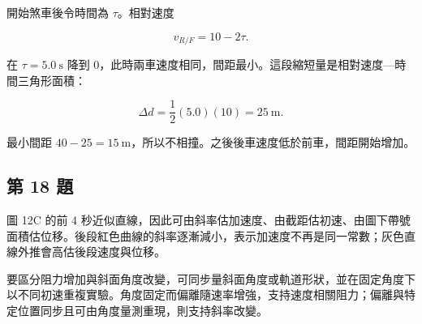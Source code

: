 \documentclass[11pt,a4paper]{article}
\begin{document}
開始煞車後令時間為 \(\tau\)。相對速度

\[
v_{R/F}=10-2\tau.
\]

在 \(\tau=5.0\ \mathrm s\) 降到 0，此時兩車速度相同，間距最小。這段縮短量是相對速度---時間三角形面積：

\[
\Delta d=\frac12(5.0)(10)=25\ \mathrm m.
\]

最小間距 \(40-25=15\ \mathrm m\)，所以不相撞。之後後車速度低於前車，間距開始增加。

\subsection{第 18 題}\label{ux7b2c-18-ux984c}

圖 12C 的前 4 秒近似直線，因此可由斜率估加速度、由截距估初速、由圖下帶號面積估位移。後段紅色曲線的斜率逐漸減小，表示加速度不再是同一常數；灰色直線外推會高估後段速度與位移。

要區分阻力增加與斜面角度改變，可同步量斜面角度或軌道形狀，並在固定角度下以不同初速重複實驗。角度固定而偏離隨速率增強，支持速度相關阻力；偏離與特定位置同步且可由角度量測重現，則支持斜率改變。
\end{document}
